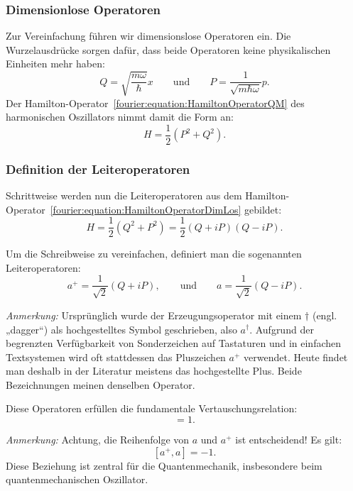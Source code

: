 		\subsubsection{Dimensionlose Operatoren\label{fourier:subsubsection:DimensionsloseOperatoren}}
			Zur Vereinfachung führen wir dimensionslose Operatoren ein.
			Die Wurzelausdrücke sorgen dafür, dass beide Operatoren keine physikalischen Einheiten mehr haben:
			\[
				Q = \sqrt{\frac{m\omega}{\hbar}}x
				\qquad\text{und}\qquad
				P = \frac{1}{\sqrt{m\hbar\omega}}p.
			\]
			Der Hamilton-Operator~\ref{fourier:equation:HamiltonOperatorQM} des harmonischen Oszillators nimmt damit die Form an:
			\begin{equation}\label{fourier:equation:HamiltonOperatorDimLos}
				H = \frac{1}{2}(P^2 + Q^2).
			\end{equation}

		\subsubsection{Definition der Leiteroperatoren\label{fourier:subsubsection:DefinitionLeiteroperatoren}}
			Schrittweise werden nun die Leiteroperatoren aus dem Hamilton-Operator~\ref{fourier:equation:HamiltonOperatorDimLos} gebildet:
			\[
				H = \frac{1}{2}(Q^2 + P^2) = \frac{1}{2}(Q + iP)(Q - iP).
			\]

			Um die Schreibweise zu vereinfachen, definiert man die sogenannten Leiteroperatoren:
			\begin{equation}
				a^+ = \frac{1}{\sqrt{2}}(Q + iP),
				\qquad\text{und}\qquad
				a = \frac{1}{\sqrt{2}}(Q - iP).
			\end{equation}

			\textit{Anmerkung:}
			Ursprünglich wurde der Erzeugungsoperator mit einem $\dagger$ (engl. „dagger“) als hochgestelltes Symbol geschrieben, also $a^\dagger$.
			Aufgrund der begrenzten Verfügbarkeit von Sonderzeichen auf Tastaturen und in einfachen Textsystemen wird oft stattdessen das Pluszeichen $a^+$ verwendet.
			Heute findet man deshalb in der Literatur meistens das hochgestellte Plus.
			Beide Bezeichnungen meinen denselben Operator.

			Diese Operatoren erfüllen die fundamentale Vertauschungsrelation:
			\begin{equation}
				[a, a^+] = 1.
			\end{equation}

			\textit{Anmerkung:}
			Achtung, die Reihenfolge von $a$ und $a^+$ ist entscheidend! Es gilt:
			\[
				[a^+, a] = -1.
			\]
			Diese Beziehung ist zentral für die Quantenmechanik, insbesondere beim quantenmechanischen Oszillator.

